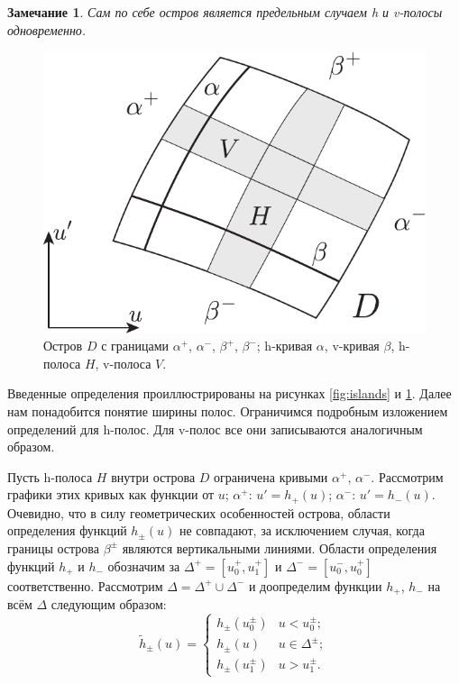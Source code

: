 \documentclass{article}
\newtheorem{remark}{Замечание}
\begin{document}
\begin{remark}
	Сам по себе остров является предельным случаем \emph{h} и \emph{v}-полосы одновременно.
\label{rem:island}
\end{remark}

\begin{figure}[h]
\centering
  \includegraphics[scale = 0.8]{pic/curves and strips}
  \caption{Остров $D$ с границами $\alpha^+$, $\alpha^-$, $\beta^+$, $\beta^-$; h-кривая $\alpha$, v-кривая $\beta$, h-полоса $H$, v-полоса $V$.}
\label{fig:curves-and-strips}
\end{figure}

Введенные определения проиллюстрированы на рисунках \ref{fig:islands} и \ref{fig:curves-and-strips}.
Далее нам понадобится понятие ширины полос.
Ограничимся подробным изложением определений для h-полос.
Для v-полос все они записываются аналогичным образом.

Пусть h-полоса $H$ внутри острова $D$ ограничена кривыми $\alpha^+$, $\alpha^-$.
Рассмотрим графики этих кривых как функции от $u$; $\alpha^+$: $u' = h_+(u)$; $\alpha^-$: $u' = h_-(u)$.
Очевидно, что в силу геометрических особенностей острова, области определения функций $h_{\pm}(u)$ не совпадают, за исключением случая, когда границы острова $\beta^{\pm}$ являются вертикальными линиями.
Области определения функций $h_+$ и $h_-$ обозначим за $\Delta^+ = [u_0^+, u_1^+]$ и $\Delta^- = [u_0^-, u_0^+]$ соответственно.
Рассмотрим $\Delta = \Delta^+ \cup \Delta^-$ и доопределим функции $h_+$, $h_-$ на всём $\Delta$ следующим образом:
\begin{equation}
	\widetilde{h}_{\pm}(u) = \begin{cases}
		h_{\pm}(u_0^{\pm}) & u < u_0^{\pm}; \\
		h_{\pm}(u) & u \in \Delta^{\pm}; \\
		h_{\pm}(u_1^{\pm}) & u > u_1^{\pm}.
	\end{cases}
\end{equation}
\end{document}
